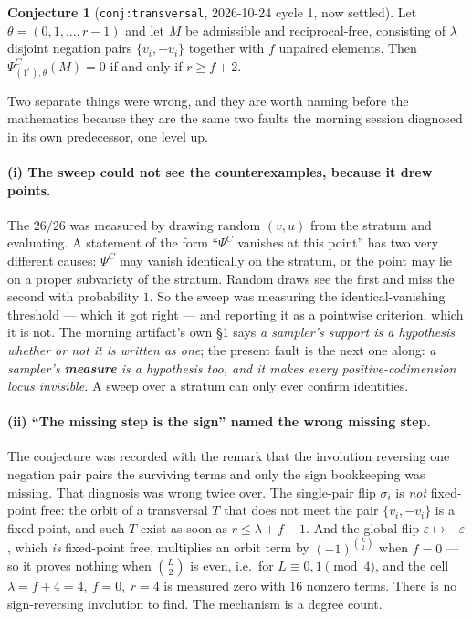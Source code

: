 \documentclass[11pt]{article}
\theoremstyle{definition}
\newtheorem{conjecture}[theorem]{Conjecture}
\theoremstyle{remark}
\newcommand{\PsiC}{\Psi^{C}}
\newcommand{\bftheta}{\theta}
\begin{document}
\begin{conjecture}[\texttt{conj:transversal}, 2026-10-24 cycle 1, now settled]
\label{conj:old}
Let $\bftheta=(0,1,\dots,r-1)$ and let $M$ be admissible and reciprocal-free,
consisting of $\lambda$ disjoint negation pairs $\{v_i,-v_i\}$ together with $f$
unpaired elements. Then $\PsiC_{(1^r),\bftheta}(M)=0$ if and only if $r\ge f+2$.
\end{conjecture}

Two separate things were wrong, and they are worth naming before the mathematics
because they are the same two faults the morning session diagnosed in its own
predecessor, one level up.

\paragraph{(i) The sweep could not see the counterexamples, because it drew points.}
The $26/26$ was measured by drawing random $(v,u)$ from the stratum and evaluating.
A statement of the form ``$\PsiC$ vanishes at this point'' has two very different
causes: $\PsiC$ may vanish identically on the stratum, or the point may lie on a proper
subvariety of the stratum. Random draws see the first and miss the second with
probability $1$. So the sweep was measuring the identical-vanishing threshold --- which
it got right --- and reporting it as a pointwise criterion, which it is not. The
morning artifact's own \S1 says \emph{a sampler's support is a hypothesis whether or not
it is written as one}; the present fault is the next one along: \emph{a sampler's
\textbf{measure} is a hypothesis too, and it makes every positive-codimension locus
invisible.} A sweep over a stratum can only ever confirm identities.

\paragraph{(ii) ``The missing step is the sign'' named the wrong missing step.}
The conjecture was recorded with the remark that the involution reversing one negation
pair pairs the surviving terms and only the sign bookkeeping was missing. That
diagnosis was wrong twice over. The single-pair flip $\sigma_i$ is \emph{not}
fixed-point free: the orbit of a transversal $T$ that does not meet the pair
$\{v_i,-v_i\}$ is a fixed point, and such $T$ exist as soon as $r\le\lambda+f-1$. And
the global flip $\varepsilon\mapsto-\varepsilon$, which \emph{is} fixed-point free,
multiplies an orbit term by $(-1)^{\binom{L}{2}}$ when $f=0$ --- so it proves nothing
when $\binom{L}{2}$ is even, i.e.\ for $L\equiv0,1\pmod4$, and the cell
$\lambda=f+4=4,\ f=0,\ r=4$ is measured zero with $16$ nonzero terms. There is no
sign-reversing involution to find. The mechanism is a degree count.
\end{document}
